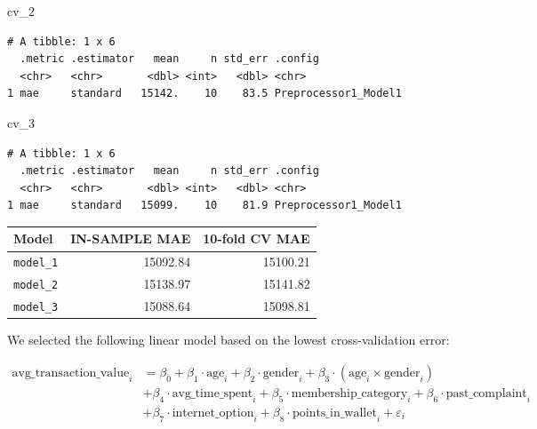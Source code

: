 \documentclass[
  letterpaper,
  DIV=11,
  numbers=noendperiod]{scrartcl}
\newenvironment{Shaded}{\begin{snugshade}}{\end{snugshade}}
\newcommand{\NormalTok}[1]{\textcolor[rgb]{0.00,0.23,0.31}{#1}}
\begin{document}
\begin{Shaded}
\begin{Highlighting}[]
\NormalTok{cv\_2 }
\end{Highlighting}
\end{Shaded}

\begin{verbatim}
# A tibble: 1 x 6
  .metric .estimator   mean     n std_err .config             
  <chr>   <chr>       <dbl> <int>   <dbl> <chr>               
1 mae     standard   15142.    10    83.5 Preprocessor1_Model1
\end{verbatim}

\begin{Shaded}
\begin{Highlighting}[]
\NormalTok{cv\_3 }
\end{Highlighting}
\end{Shaded}

\begin{verbatim}
# A tibble: 1 x 6
  .metric .estimator   mean     n std_err .config             
  <chr>   <chr>       <dbl> <int>   <dbl> <chr>               
1 mae     standard   15099.    10    81.9 Preprocessor1_Model1
\end{verbatim}

\begin{longtable}[]{@{}lrr@{}}
\toprule\noalign{}
Model & IN-SAMPLE MAE & 10-fold CV MAE \\
\midrule\noalign{}
\endhead
\bottomrule\noalign{}
\endlastfoot
\texttt{model\_1} & 15092.84 & 15100.21 \\
\texttt{model\_2} & 15138.97 & 15141.82 \\
\texttt{model\_3} & 15088.64 & 15098.81 \\
\end{longtable}

We selected the following linear model based on the lowest
cross-validation error:

\begin{align*}
\text{avg\_transaction\_value}_i &= \beta_0 
+ \beta_1 \cdot \text{age}_i 
+ \beta_2 \cdot \text{gender}_i 
+ \beta_3 \cdot (\text{age}_i \times \text{gender}_i) \\
&+ \beta_4 \cdot \text{avg\_time\_spent}_i 
+ \beta_5 \cdot \text{membership\_category}_i 
+ \beta_6 \cdot \text{past\_complaint}_i \\
&+ \beta_7 \cdot \text{internet\_option}_i 
+ \beta_8 \cdot \text{points\_in\_wallet}_i 
+ \varepsilon_i
\end{align*}
\end{document}
